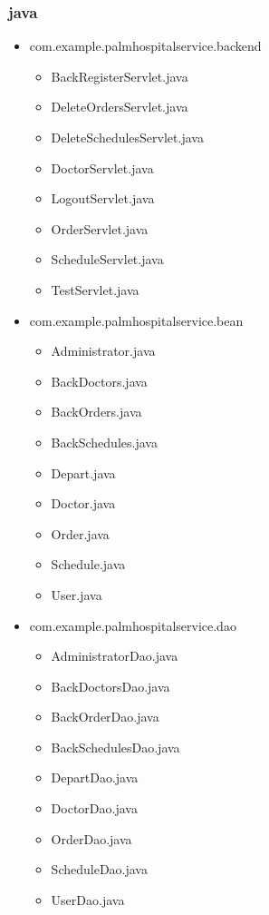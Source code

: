 \documentclass[UTF8,12pt]{article}
\begin{document}
\subsubsection{java}
\begin{itemize}
    \item com.example.palmhospitalservice.backend
    \begin{itemize}
        \item BackRegisterServlet.java
        \item DeleteOrdersServlet.java
        \item DeleteSchedulesServlet.java
        \item DoctorServlet.java
        \item LogoutServlet.java
        \item OrderServlet.java
        \item ScheduleServlet.java
        \item TestServlet.java
    \end{itemize}
    \item com.example.palmhospitalservice.bean
    \begin{itemize}
        \item Administrator.java
        \item BackDoctors.java
        \item BackOrders.java
        \item BackSchedules.java
        \item Depart.java
        \item Doctor.java
        \item Order.java
        \item Schedule.java
        \item User.java
    \end{itemize}
    \item com.example.palmhospitalservice.dao
    \begin{itemize}
        \item AdministratorDao.java
        \item BackDoctorsDao.java
        \item BackOrderDao.java
        \item BackSchedulesDao.java
        \item DepartDao.java
        \item DoctorDao.java
        \item OrderDao.java
        \item ScheduleDao.java
        \item UserDao.java

\end{itemize}
\end{itemize}
\end{document}
